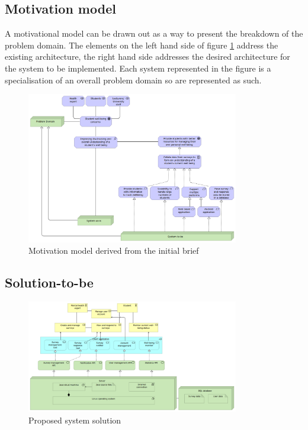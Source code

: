 \subsection{Motivation model}
A motivational model can be drawn out as a way to present the breakdown of the problem domain.
The elements on the left hand side of figure \ref{motivationmodel} address the existing architecture, the right hand side addresses the desired
architecture for the system to be implemented.
Each system represented in the figure is a specialisation of an overall problem domain so are represented as such.

\begin{figure}[H]
    \centering
    \includegraphics[width=350px]{images/motivation_model.png}
    \caption{Motivation model derived from the initial brief}
    \label{motivationmodel}
\end{figure}

\subsection{Solution-to-be}

\begin{figure}[H]
    \centering
    \includegraphics[width=350px]{images/solution-to-be.png}
    \caption{Proposed system solution}
    \label{solutiontobe}
\end{figure}


